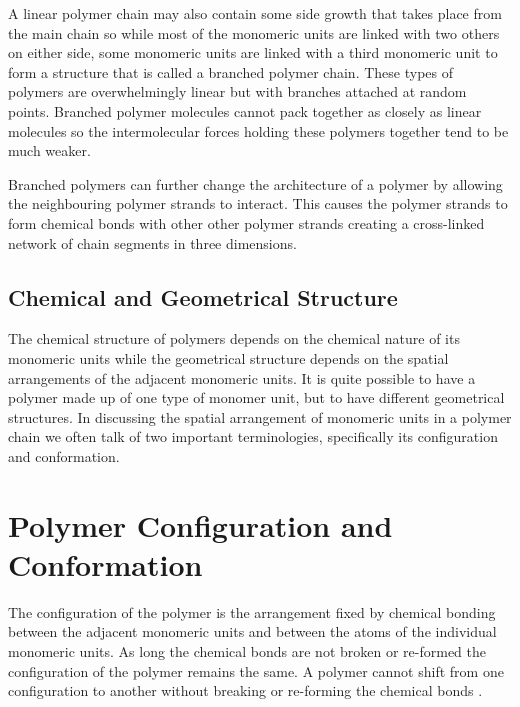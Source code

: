 A linear polymer chain may also contain some side growth that takes place from the main chain so while most of the monomeric units are linked with two others on either side, some monomeric units are linked with a third monomeric unit to form a structure that is called a branched polymer chain. These types of polymers are overwhelmingly linear but with branches attached at random points. Branched polymer molecules cannot pack together as closely as linear molecules so the intermolecular forces holding these polymers together tend to be much weaker.

Branched polymers can further change the architecture of a polymer by allowing the neighbouring polymer strands to interact. This causes the polymer strands to form chemical bonds with other other polymer strands creating a cross-linked network of chain segments in three dimensions. 

\subsection{Chemical and Geometrical Structure}

The chemical structure of polymers depends on the chemical nature of its monomeric units while the geometrical structure depends on the spatial arrangements of the adjacent monomeric units. It is quite possible to have a polymer made up of one type of monomer unit, but to have different geometrical structures. In discussing the spatial arrangement of monomeric units in a polymer chain we often talk of two important terminologies, specifically its configuration and conformation.

\section{Polymer Configuration and Conformation}

The configuration of the polymer is the arrangement fixed by chemical bonding between the adjacent monomeric units and between the atoms of the individual monomeric units. As long the chemical bonds are not broken or re-formed the configuration of the polymer remains the same. A polymer cannot shift from one configuration to another without breaking or re-forming the chemical bonds \cite{poly_sci_eng,bower2002}.  


